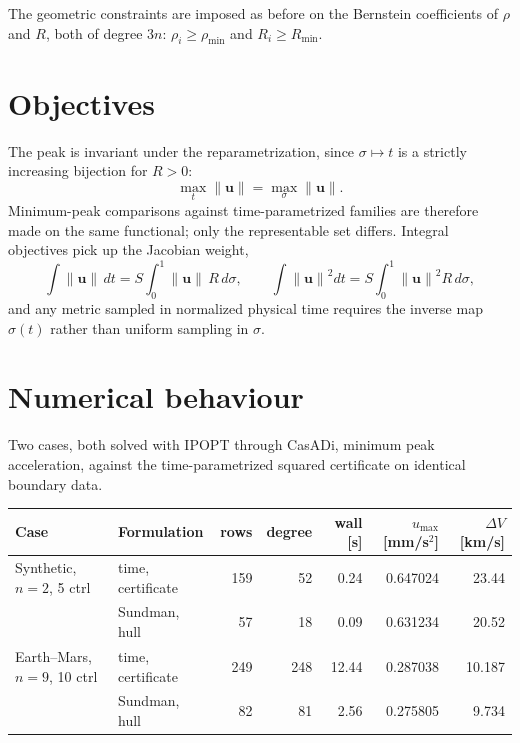 \documentclass[11pt]{article}
\newcommand{\umax}{u_{\max}}
\newcommand{\norm}[1]{\left\lVert #1\right\rVert}
\begin{document}
The geometric constraints are imposed as before on the Bernstein coefficients of
$\rho$ and $R$, both of degree $3n$:
$\rho_i\ge\rho_{\min}$ and $R_i\ge R_{\min}$.

\section{Objectives}

The peak is invariant under the reparametrization, since $\sigma\mapsto t$ is a
strictly increasing bijection for $R>0$:
\begin{equation}
  \max_t\norm{\mathbf u} = \max_\sigma\norm{\mathbf u}.
\end{equation}
Minimum-peak comparisons against time-parametrized families are therefore
made on the same functional; only the representable set differs. Integral
objectives pick up the Jacobian weight,
\begin{equation}
  \int\norm{\mathbf u}\,dt = S\int_0^1 \norm{\mathbf u}\,R\,d\sigma,
  \qquad
  \int\norm{\mathbf u}^2 dt = S\int_0^1 \norm{\mathbf u}^2 R\,d\sigma,
\end{equation}
and any metric sampled in normalized physical time requires the inverse map
$\sigma(t)$ rather than uniform sampling in $\sigma$.

\section{Numerical behaviour}

Two cases, both solved with IPOPT through CasADi, minimum peak acceleration,
against the time-parametrized squared certificate on identical boundary data.

\begin{center}
\small
\begin{tabular}{llrrrrr}
\toprule
Case & Formulation & rows & degree & wall [s] & $\umax$ [mm/s$^2$] & $\Delta V$ [km/s] \\
\midrule
 Synthetic, $n=2$, 5 ctrl & time, certificate & 159 & 52  & 0.24 & 0.647024 & 23.44 \\
                          & Sundman, hull     &  57 & 18  & 0.09 & 0.631234 & 20.52 \\
\addlinespace
 Earth--Mars, $n=9$, 10 ctrl & time, certificate & 249 & 248 & 12.44 & 0.287038 & 10.187 \\
                             & Sundman, hull     &  82 &  81 &  2.56 & 0.275805 &  9.734 \\
\bottomrule
\end{tabular}
\end{center}
\end{document}
